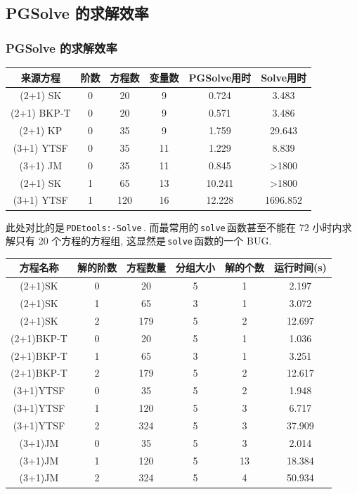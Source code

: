 \documentclass{beamer}
\newcommand{\cd}[1]{\,\texttt{#1}\,}
\begin{document}
\subsection{PGSolve 的求解效率}
\begin{frame}
\frametitle{PGSolve 的求解效率}
\begin{adjustbox}{max width=\textwidth}
\centering
\renewcommand{\arraystretch}{1.3}
\begin{tabular}{cccccc}
\hline
来源方程 & 阶数 & 方程数 & 变量数 & PGSolve用时 & Solve用时 \\
\hline
(2+1) SK & 0 & 20 & 9 & 0.724 & 3.483 \\
(2+1) BKP-T & 0 & 20 & 9 & 0.571 & 3.486 \\
(2+1) KP & 0 & 35 & 9 & 1.759 & 29.643 \\
(3+1) YTSF & 0 & 35 & 11 & 1.229 & 8.839 \\
(3+1) JM & 0 & 35 & 11 & 0.845 & >1800 \\
(2+1) SK & 1 & 65 & 13 & 10.241 & >1800 \\
(3+1) YTSF & 1 & 120 & 16 & 12.228 & 1696.852 \\
\hline
\end{tabular}
\end{adjustbox}

\vspace{1em}

此处对比的是\cd{PDEtools:-Solve}. 而最常用的\cd{solve}函数甚至不能在 72 小时内求解只有 20 个方程的方程组, 这显然是\cd{solve}函数的一个 BUG.

\end{frame}

\begin{frame}

\begin{adjustbox}{max width=\textwidth}
\renewcommand{\arraystretch}{1.3}
\begin{tabular}{cccccc}
\hline
方程名称    & 解的阶数 & 方程数量 & 分组大小 & 解的个数 & 运行时间(s) \\ 
\hline 
(2+1)SK & 0 & 20 & 5 & 1 & 2.197 \\
(2+1)SK & 1 & 65 & 3 & 1 & 3.072 \\
(2+1)SK & 2 & 179 & 5 & 2 & 12.697 \\
(2+1)BKP-T & 0 & 20 & 5 & 1 & 1.036 \\
(2+1)BKP-T & 1 & 65 & 3 & 1 & 3.251 \\
(2+1)BKP-T & 2 & 179 & 5 & 2 & 12.617 \\
(3+1)YTSF & 0 & 35 & 5 & 2 & 1.948 \\
(3+1)YTSF & 1 & 120 & 5 & 3 & 6.717 \\
(3+1)YTSF & 2 & 324 & 5 & 3 & 37.909 \\
(3+1)JM & 0 & 35 & 5 & 3 & 2.014 \\
(3+1)JM & 1 & 120 & 5 & 13 & 18.384 \\
(3+1)JM & 2 & 324 & 5 & 4 & 50.934 \\
\hline 
\end{tabular}
\end{adjustbox}

\end{frame}
\end{document}
